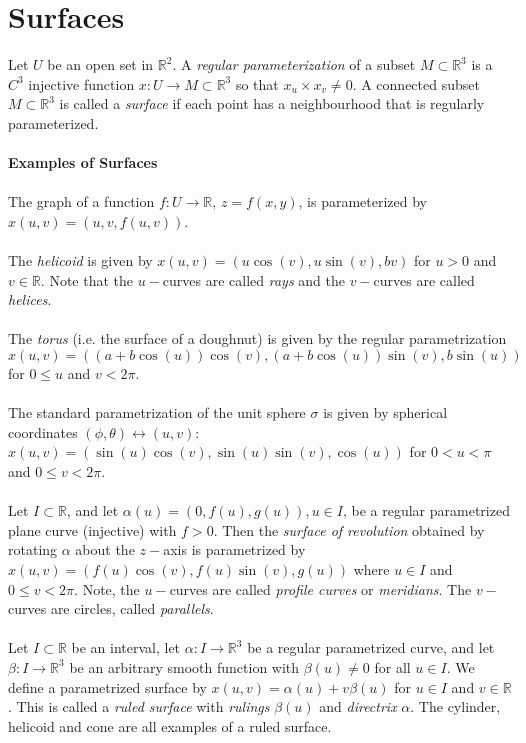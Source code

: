 \documentclass{article}
\begin{document}
    \section*{Surfaces}
    Let $U$ be an open set in $\mathbb{R}^2$. A \textit{regular parameterization} of a subset $M\subset\mathbb{R}^3$ is a $C^3$
    injective function $x: U\to M\subset\mathbb{R}^3$ so that $x_u\times x_v\neq 0$. A connected subset
    $M\subset\mathbb{R}^3$ is called a \textit{surface} if each point has a neighbourhood that is regularly parameterized.\\\\
    \textbf{Examples of Surfaces}\\\\
    The graph of a function $f:U\to \mathbb{R}$, $z=f(x,y)$, is parameterized by $x(u,v) = (u,v,f(u,v))$.\\\\
    The \textit{helicoid} is given by $x(u,v) = (u\cos(v),u\sin(v),bv)$ for $u>0$ and $v\in\mathbb{R}$. Note that the
    $u-$curves are called \textit{rays} and the $v-$curves are called \textit{helices}.\\\\
    The \textit{torus} (i.e. the surface of a doughnut) is given by the regular parametrization $x(u,v) = 
    ((a+b\cos(u))\cos(v),(a+b\cos(u))\sin(v),b\sin(u))$ for $0\leq u$ and $v<2\pi$.\\\\
    The standard parametrization of the unit sphere $\sigma$ is given by spherical coordinates $(\phi,\theta)\leftrightarrow
    (u,v)$: $x(u,v) = (\sin(u)\cos(v),\sin(u)\sin(v),\cos(u))$ for $0<u<\pi$ and $0\leq v<2\pi$.\\\\
    Let $I\subset\mathbb{R}$, and let $\alpha(u) = (0,f(u),g(u)), u\in I$, be a regular parametrized plane curve (injective) with
    $f > 0$. Then the \textit{surface of revolution} obtained by rotating $\alpha$ about the $z-$axis is parametrized by
    $x(u,v) = (f(u)\cos(v),f(u)\sin(v),g(u))$ where $u\in I$ and $0\leq v < 2\pi$. Note, the $u-$curves are called
    \textit{profile curves} or \textit{meridians}. The $v-$curves are circles, called \textit{parallels}.\\\\
    Let $I\subset\mathbb{R}$ be an interval, let $\alpha: I\to\mathbb{R}^3$ be a regular parametrized curve, and let
    $\beta: I \to \mathbb{R}^3$ be an arbitrary smooth function with $\beta(u)\neq 0$ for all $u\in I$. We define a parametrized
    surface by $x(u,v) = \alpha(u) + v\beta(u)$ for $u\in I$ and $v\in\mathbb{R}$. This is called a \textit{ruled surface}
    with \textit{rulings} $\beta(u)$ and \textit{directrix} $\alpha$. The cylinder, helicoid and cone are all examples of a
    ruled surface.
    \newpage
\end{document}
